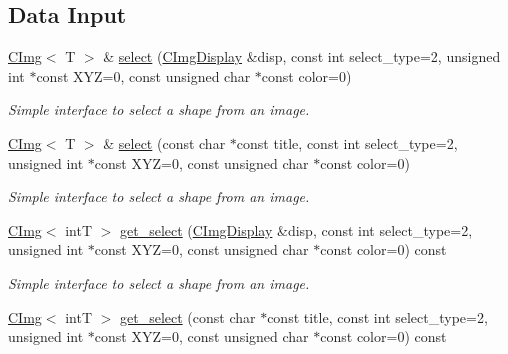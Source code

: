\subsection*{Data Input}
\label{_amgrpb77bbd177ec1e4d71a0fe96d3d4e8b39}
 \begin{DoxyCompactItemize}
\item 
\hyperlink{structcimg__library_1_1CImg}{CImg}$<$ T $>$ \& \hyperlink{structcimg__library_1_1CImg_a0a8ac68afbfb317c60b7554f5cdcbbd5}{select} (\hyperlink{structcimg__library_1_1CImgDisplay}{CImgDisplay} \&disp, const int select\_\-type=2, unsigned int $\ast$const XYZ=0, const unsigned char $\ast$const color=0)
\begin{DoxyCompactList}\small\item\em Simple interface to select a shape from an image. \item\end{DoxyCompactList}\item 
\hypertarget{structcimg__library_1_1CImg_a261706fc929ade9d440e0eb66b08f843}{
\hyperlink{structcimg__library_1_1CImg}{CImg}$<$ T $>$ \& \hyperlink{structcimg__library_1_1CImg_a261706fc929ade9d440e0eb66b08f843}{select} (const char $\ast$const title, const int select\_\-type=2, unsigned int $\ast$const XYZ=0, const unsigned char $\ast$const color=0)}
\label{structcimg__library_1_1CImg_a261706fc929ade9d440e0eb66b08f843}

\begin{DoxyCompactList}\small\item\em Simple interface to select a shape from an image. \item\end{DoxyCompactList}\item 
\hypertarget{structcimg__library_1_1CImg_a58b982e2bd8adf8792df5caff7549aa6}{
\hyperlink{structcimg__library_1_1CImg}{CImg}$<$ intT $>$ \hyperlink{structcimg__library_1_1CImg_a58b982e2bd8adf8792df5caff7549aa6}{get\_\-select} (\hyperlink{structcimg__library_1_1CImgDisplay}{CImgDisplay} \&disp, const int select\_\-type=2, unsigned int $\ast$const XYZ=0, const unsigned char $\ast$const color=0) const }
\label{structcimg__library_1_1CImg_a58b982e2bd8adf8792df5caff7549aa6}

\begin{DoxyCompactList}\small\item\em Simple interface to select a shape from an image. \item\end{DoxyCompactList}\item 
\hypertarget{structcimg__library_1_1CImg_ae64832c20063e4c9bd1dbc6a3ffe3173}{
\hyperlink{structcimg__library_1_1CImg}{CImg}$<$ intT $>$ \hyperlink{structcimg__library_1_1CImg_ae64832c20063e4c9bd1dbc6a3ffe3173}{get\_\-select} (const char $\ast$const title, const int select\_\-type=2, unsigned int $\ast$const XYZ=0, const unsigned char $\ast$const color=0) const }
\label{structcimg__library_1_1CImg_ae64832c20063e4c9bd1dbc6a3ffe3173}


\end{DoxyCompactItemize}
